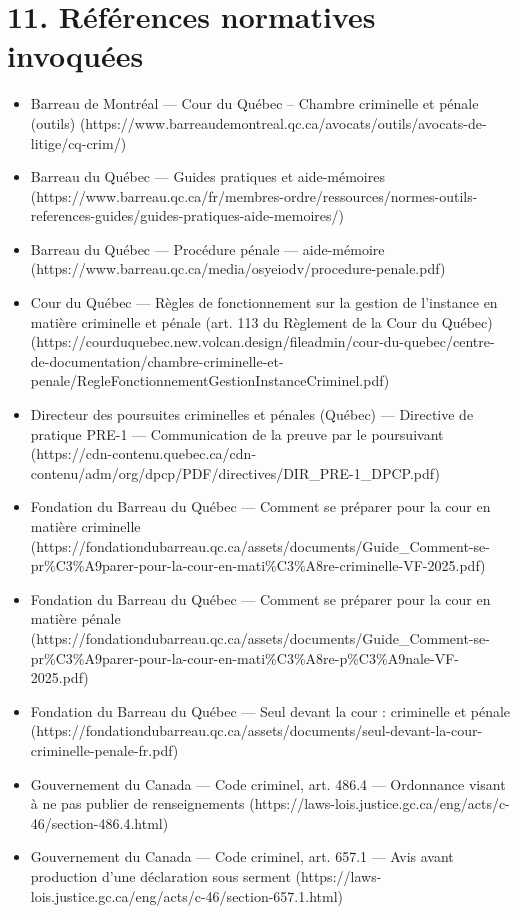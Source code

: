 \documentclass[12pt,a4paper]{article}
\begin{document}
\section*{11. Références normatives invoquées}
\begin{itemize}
  \item Barreau de Montréal — Cour du Québec – Chambre criminelle et pénale (outils) (https://www.barreaudemontreal.qc.ca/avocats/outils/avocats-de-litige/cq-crim/)
  \item Barreau du Québec — Guides pratiques et aide-mémoires (https://www.barreau.qc.ca/fr/membres-ordre/ressources/normes-outils-references-guides/guides-pratiques-aide-memoires/)
  \item Barreau du Québec — Procédure pénale — aide-mémoire (https://www.barreau.qc.ca/media/osyeiodv/procedure-penale.pdf)
  \item Cour du Québec — Règles de fonctionnement sur la gestion de l'instance en matière criminelle et pénale (art. 113 du Règlement de la Cour du Québec) (https://courduquebec.new.volcan.design/fileadmin/cour-du-quebec/centre-de-documentation/chambre-criminelle-et-penale/RegleFonctionnementGestionInstanceCriminel.pdf)
  \item Directeur des poursuites criminelles et pénales (Québec) — Directive de pratique PRE-1 — Communication de la preuve par le poursuivant (https://cdn-contenu.quebec.ca/cdn-contenu/adm/org/dpcp/PDF/directives/DIR\_PRE-1\_DPCP.pdf)
  \item Fondation du Barreau du Québec — Comment se préparer pour la cour en matière criminelle (https://fondationdubarreau.qc.ca/assets/documents/Guide\_Comment-se-pr\%C3\%A9parer-pour-la-cour-en-mati\%C3\%A8re-criminelle-VF-2025.pdf)
  \item Fondation du Barreau du Québec — Comment se préparer pour la cour en matière pénale (https://fondationdubarreau.qc.ca/assets/documents/Guide\_Comment-se-pr\%C3\%A9parer-pour-la-cour-en-mati\%C3\%A8re-p\%C3\%A9nale-VF-2025.pdf)
  \item Fondation du Barreau du Québec — Seul devant la cour : criminelle et pénale (https://fondationdubarreau.qc.ca/assets/documents/seul-devant-la-cour-criminelle-penale-fr.pdf)
  \item Gouvernement du Canada — Code criminel, art. 486.4 — Ordonnance visant à ne pas publier de renseignements (https://laws-lois.justice.gc.ca/eng/acts/c-46/section-486.4.html)
  \item Gouvernement du Canada — Code criminel, art. 657.1 — Avis avant production d'une déclaration sous serment (https://laws-lois.justice.gc.ca/eng/acts/c-46/section-657.1.html)
\end{itemize}
\end{document}
